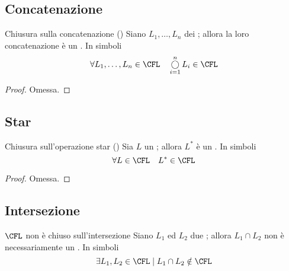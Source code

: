 \documentclass[a4paper, 12pt]{report}
\begin{document}
    \subsection{Concatenazione}

    \begin{framedprop}{Chiusura sulla concatenazione (\CFL)}
        Siano $L_1, \ldots, L_n$ dei \CFL; allora la loro concatenazione è un \CFL. In simboli $$\forall L_1, \ldots, L_n \in \CFL \quad \displaystyle \mathop{\bigcirc}_{i = 1}^n{L_i} \in \CFL$$
    \end{framedprop}

    \begin{proof}
        Omessa.
    \end{proof}

    \subsection{Star}

    \begin{framedprop}{Chiusura sull'operazione star (\CFL)}
        Sia $L$ un \CFL; allora $L^*$ è un \CFL. In simboli $$\forall L \in \CFL \quad L^* \in \CFL$$
    \end{framedprop}

    \begin{proof}
        Omessa.
    \end{proof}

    \subsection{Intersezione}

    \begin{framedprop}{$\mathrm{\CFL}$ non è chiuso sull'intersezione}
        Siano $L_1$ ed $L_2$ due \CFL; allora $L_1 \cap L_2$ non è necessariamente un \CFL. In simboli $$\exists L_1, L_2 \in \CFL \mid L_1 \cap L_2 \notin \CFL$$
    \end{framedprop}
\end{document}
